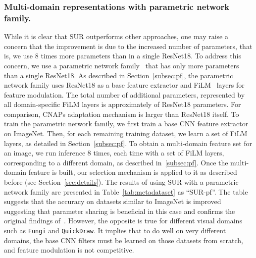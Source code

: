 \documentclass[runningheads]{llncs}
\begin{document}
\subsubsection{Multi-domain representations with parametric network family.}
While it is clear that SUR outperforms other approaches, one may raise a
concern that the improvement is due to the increased number of parameters, that is,
we use 8 times more parameters than in a single ResNet18.
To address this concern, we use a parametric network
family~\cite{rebuffi2018efficient} that has only  more parameters than a
single ResNet18. As described in Section~\ref{subsec:pf}, the parametric network
family uses ResNet18 as a base feature extractor and FiLM~\cite{perez2018film}
layers for feature modulation. The total number of additional parameters,
represented by all domain-specific FiLM layers is approximately  of
ResNet18 parameters. For comparison, CNAPs adaptation mechanism is larger than
ResNet18 itself. To train the parametric network family, we first train a base
CNN feature extractor on ImageNet. Then, for each remaining training dataset, we
learn a set of FiLM layers, as detailed in Section~\ref{subsec:pf}. To obtain a
multi-domain feature set for an image, we run inference 8 times, each time with a
set of FiLM layers, corresponding to a different domain, as described
in~\ref{subsec:pf}. Once the multi-domain feature is built, our selection mechanism
is applied to it as described before (see Section~\ref{sec:details}). The
results of using SUR with a parametric network family are presented in
Table~\ref{tab:metadataset} as ``SUR-pf''. The table suggests that the accuracy
on datasets similar to ImageNet is improved suggesting that parameter
sharing is beneficial in this case and confirms the original findings
of~\cite{rebuffi2018efficient}. However, the opposite is true for different
visual domains such as \texttt{Fungi} and \texttt{QuickDraw}. It implies that to
do well on very different domains, the base CNN filters must be
learned on those datasets from scratch, and feature modulation is not
competitive.
\end{document}
